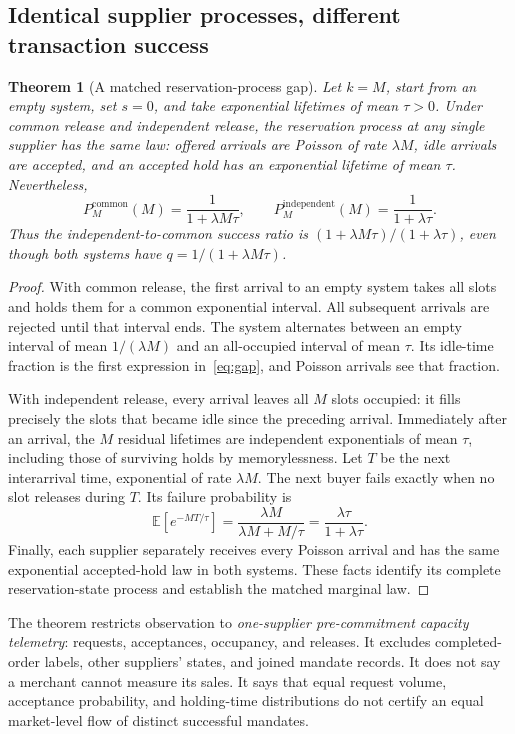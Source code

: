 \documentclass[11pt,a4paper]{article}
\newtheorem{theorem}{Theorem}
\newcommand{\E}{\mathbb E}
\begin{document}
\subsection{Identical supplier processes, different transaction success}
\begin{theorem}[A matched reservation-process gap]\label{thm:gap}
Let $k=M$, start from an empty system, set $s=0$, and take exponential lifetimes of mean $\tau>0$. Under common release and independent release, the reservation process at any single supplier has the same law: offered arrivals are Poisson of rate $\lambda M$, idle arrivals are accepted, and an accepted hold has an exponential lifetime of mean $\tau$. Nevertheless,
\begin{equation}
 P_M^{\mathrm{common}}(M)=\frac{1}{1+\lambda M\tau},\qquad
 P_M^{\mathrm{independent}}(M)=\frac{1}{1+\lambda\tau}.\label{eq:gap}
\end{equation}
Thus the independent-to-common success ratio is
$(1+\lambda M\tau)/(1+\lambda\tau)$, even though both systems have $q=1/(1+\lambda M\tau)$.
\end{theorem}
\begin{proof}
With common release, the first arrival to an empty system takes all slots and holds them for a common exponential interval. All subsequent arrivals are rejected until that interval ends. The system alternates between an empty interval of mean $1/(\lambda M)$ and an all-occupied interval of mean $\tau$. Its idle-time fraction is the first expression in~\eqref{eq:gap}, and Poisson arrivals see that fraction.

With independent release, every arrival leaves all $M$ slots occupied: it fills precisely the slots that became idle since the preceding arrival. Immediately after an arrival, the $M$ residual lifetimes are independent exponentials of mean $\tau$, including those of surviving holds by memorylessness. Let $T$ be the next interarrival time, exponential of rate $\lambda M$. The next buyer fails exactly when no slot releases during $T$. Its failure probability is
\[
 \E[e^{-MT/\tau}]=\frac{\lambda M}{\lambda M+M/\tau}
 =\frac{\lambda\tau}{1+\lambda\tau}.
\]
Finally, each supplier separately receives every Poisson arrival and has the same exponential accepted-hold law in both systems. These facts identify its complete reservation-state process and establish the matched marginal law.
\end{proof}

The theorem restricts observation to \emph{one-supplier pre-commitment capacity telemetry}: requests, acceptances, occupancy, and releases. It excludes completed-order labels, other suppliers' states, and joined mandate records. It does not say a merchant cannot measure its sales. It says that equal request volume, acceptance probability, and holding-time distributions do not certify an equal market-level flow of distinct successful mandates.
\end{document}
